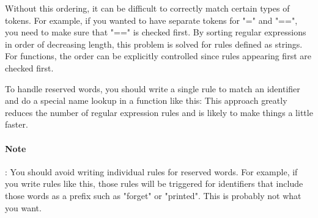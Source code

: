 Without this ordering, it can be difficult to correctly match certain types of
tokens. For example, if you wanted to have separate tokens for "=" and "==", you
need to make sure that "==" is checked first. By sorting regular expressions in
order of decreasing length, this problem is solved for rules defined as strings.
For functions, the order can be explicitly controlled since rules appearing
first are checked first.

To handle reserved words, you should write a single rule to match an identifier
and do a special name lookup in a function like this:
This approach greatly reduces the number of regular expression rules and is
likely to make things a little faster.

\paragraph{Note}: You should avoid writing individual rules for reserved words.
For example, if you write rules like this,
those rules will be triggered for identifiers that include those words as a
prefix such as "forget" or "printed". This is probably not what you want.

\secup
